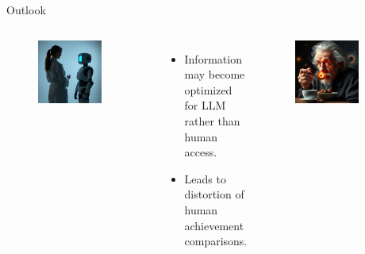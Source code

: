 \documentclass[10pt]{beamer}
\begin{document}




\begin{frame}[standout]{Outlook}
	\begin{columns}[T,onlytextwidth]
		\normalfont \normalsize
		\begin{figure}
			\includegraphics[width=0.8\textwidth]{figures/The_silhouette_of_a_standing_scientist_shown_from_behind_talking_to_a_robot_with_a_screen_head.png}
		\end{figure}
		\begin{itemize}
			\item Information may become optimized for LLM rather than human access.
			\item Leads to distortion of human achievement comparisons.
				\end{itemize}
		\begin{figure}
			\includegraphics[width=0.8\textwidth]{figures/Albert_Einstein_eating_black_holes_for_breakfast_photo_realistic_highly_detailed.png}

\end{figure}
\end{columns}
\end{frame}
\end{document}
